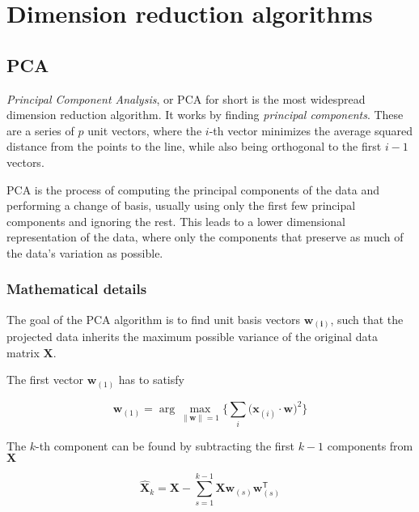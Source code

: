 \chapter{Dimension reduction algorithms}\label{ch:dimension-reduction-algorithms}




\section{PCA}\label{sec:pca}

\textit{Principal Component Analysis}\cite{bib:pca}, or PCA for short is the most widespread dimension reduction algorithm. It works by finding \textit{principal components}. These are a series of $p$ unit vectors, where the $i$-th vector minimizes the average squared distance from the points to the line, while also being orthogonal to the first $i - 1$ vectors.

PCA is the process of computing the principal components of the data and performing a change of basis, usually using only the first few principal components and ignoring the rest. This leads to a lower dimensional representation of the data, where only the components that preserve as much of the data's variation as possible.

\subsection{Mathematical details}\label{subsec:mathematical-details}

The goal of the PCA algorithm is to find unit basis vectors $\mathbf{w_{(i)}}$, such that the projected data inherits the maximum possible variance of the original data matrix $\mathbf{X}$.

The first vector $\mathbf{w}_{(1)}$ has to satisfy

\begin{equation}
	\mathbf{w}_{(1)} = \arg\max_{\lVert \mathbf{w} \rVert = 1}{ \Bigg\{ \sum_i{ \big(\mathbf{x}_{(i)} \cdot \mathbf{w} \big)^2 } \Bigg\} }
	\label{eq:pca:w1}
\end{equation}

The $k$-th component can be found by subtracting the first $k - 1$ components from $\mathbf{X}$

\begin{equation}
	\mathbf{\hat {X}}_{k}=\mathbf{X}-\sum_{s=1}^{k-1}\mathbf{X}\mathbf{w}_{(s)}\mathbf{w}_{(s)}^{\mathsf{T}}
	\label{eq:pca_xhat}
\end{equation}

